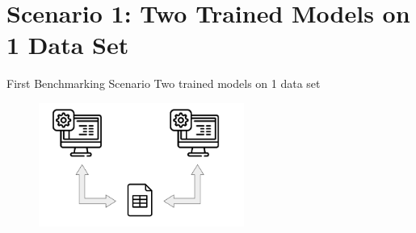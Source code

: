 \documentclass[11pt,compress,t,notes=noshow, xcolor=table]{beamer}
\begin{document}









\section{Scenario 1: Two Trained Models on 1 Data Set}
\begin{frame}{First Benchmarking Scenario}
\vfill
\centering
\large{Two trained models on 1 data set}
    \begin{figure}
        \includegraphics[width = 0.6\textwidth]{figure/2algos_1dataset.png}
    \end{figure}
\vfill
\end{frame}
\end{document}
